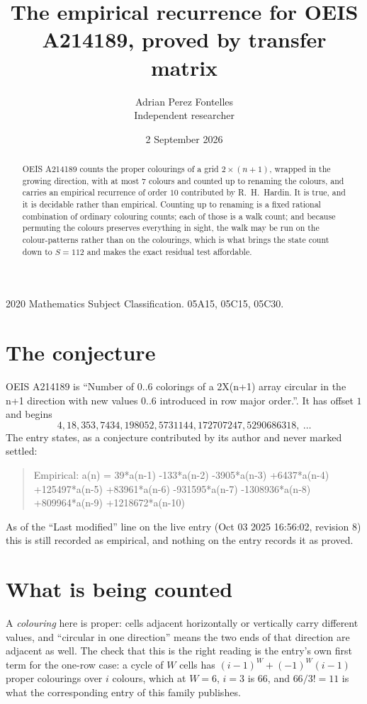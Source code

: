 \documentclass[11pt,a4paper]{article}
\title{The empirical recurrence for OEIS A214189, proved by transfer matrix}
\author{Adrian Perez Fontelles\\ \small Independent researcher}
\date{2 September 2026}
\theoremstyle{plain}
\theoremstyle{definition}
\begin{document}
\maketitle

\begin{abstract}
OEIS A214189 counts the proper colourings of a grid $2\times(n+1)$, wrapped in the growing direction, with at most $7$ colours and
counted up to renaming the colours, and carries an empirical recurrence of order $10$
contributed by R.~H.~Hardin. It is true, and it is decidable rather than empirical. Counting
up to renaming is a fixed rational combination of ordinary colouring counts; each of those is
a walk count; and because permuting the colours preserves everything in sight, the walk may be
run on the colour-patterns rather than on the colourings, which is what brings the state count
down to $S=112$ and makes the exact residual test affordable.
\end{abstract}

\noindent\small 2020 Mathematics Subject Classification. 05A15, 05C15, 05C30.\normalsize

\section{The conjecture}

OEIS A214189 is ``Number of 0..6 colorings of a 2X(n+1) array circular in the n+1 direction with new values 0..6 introduced in row major order.''. It has offset $1$ and begins
\[
4, 18, 353, 7434, 198052, 5731144, 172707247, 5290686318,\ \dots
\]
The entry states, as a conjecture contributed by its author and never marked settled:
\begin{quote}
Empirical: a(n) = 39*a(n-1) -133*a(n-2) -3905*a(n-3) +6437*a(n-4) +125497*a(n-5) +83961*a(n-6) -931595*a(n-7) -1308936*a(n-8) +809964*a(n-9) +1218672*a(n-10)
\end{quote}
As of the ``Last modified'' line on the live entry (Oct 03 2025 16:56:02, revision 8) this is still
recorded as empirical, and nothing on the entry records it as proved.

\section{What is being counted}

A \emph{colouring} here is proper: cells adjacent horizontally or vertically carry different
values, and ``circular in one direction'' means the two ends of that direction are adjacent as
well. The check that this is the right reading is the entry's own first term for the
one-row case: a cycle of $W$ cells has $(i-1)^W+(-1)^W(i-1)$ proper colourings over $i$
colours, which at $W=6$, $i=3$ is $66$, and $66/3!=11$ is what the corresponding entry of this
family publishes.
\end{document}
